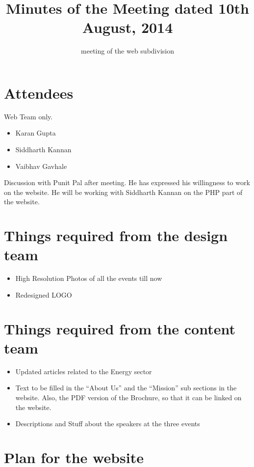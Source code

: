 \documentclass[a4paper, 11pt]{article}
\title{Minutes of the Meeting dated 10th August, 2014}
\author{meeting of the web subdivision}
\begin{document}
\maketitle

\section{Attendees}

Web Team only.

\titlerule

\begin{itemize}
\item{Karan Gupta}
\item{Siddharth Kannan}
\item{Vaibhav Gavhale}
\end{itemize}

Discussion with Punit Pal after meeting. He has expressed his willingness to work on the website. He will be working with Siddharth Kannan on the PHP part of the website.

\section{Things required from the design team}
\begin{itemize}
\item{High Resolution Photos of all the events till now}
\item{Redesigned LOGO}
\end{itemize}

\section{Things required from the content team}

\begin{itemize}
\item{Updated articles related to the Energy sector}
\item{Text to be filled in the ``About Us'' and the ``Mission'' sub sections in the website. Also, the PDF version of the Brochure, so that it can be linked on the website.}
\item{Descriptions and Stuff about the speakers at the three events}
\end{itemize}

\section{Plan for the website}
\end{document}
